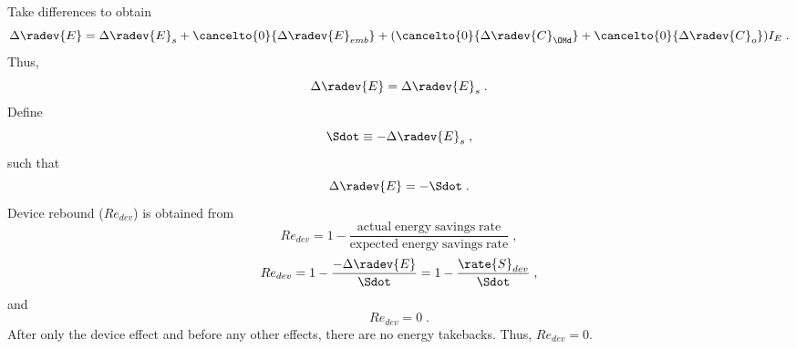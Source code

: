 \begin{landscape}
{    Take differences to obtain
  \begin{equation}
  \Delta \radev{E} = \Delta \radev{E}_s
  + \cancelto{0}{\Delta \radev{E}_{emb}} 
  + (\cancelto{0}{\Delta \radev{C}_{\OMd}} 
      + \cancelto{0}{\Delta \radev{C}_o}) I_E \; .
  \end{equation}
  Thus, 
  \begin{equation}
  \Delta \radev{E} = \Delta \radev{E}_s \; .
  \end{equation}
  Define
  \begin{equation} \label{eq:Sdot_def}
  \Sdot \equiv -\Delta \radev{E}_s \; ,
  \end{equation}
  such that
  \begin{equation}
  \Delta \radev{E} = -\Sdot \; .
  \end{equation}
  Device rebound ($Re_{dev}$) is obtained from 
  \begin{equation}
  Re_{dev} = 1 - \frac{\mathrm{actual \; energy \; savings \; rate}}{\mathrm{expected \; energy \; savings \; rate}} \; ,
  \end{equation}
  \begin{equation}
  Re_{dev} = 1 - \frac{-\Delta \radev{E}}{\Sdot} = 1 - \frac{\rate{S}_{dev}}{\Sdot} \; ,
  \end{equation}
  and
  \begin{equation}
  Re_{dev} = 0 \; .
  \end{equation}
  After only the device effect and before any other effects, 
  there are no energy takebacks. 
  Thus, $Re_{dev} = 0$.
}
{
    ~
    
}
\end{landscape}
